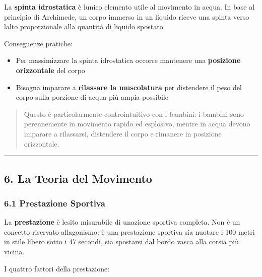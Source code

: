 \documentclass[a4paper,11pt]{article}
\providecommand{\tightlist}{%
  \setlength{\itemsep}{0pt}\setlength{\parskip}{0pt}}
\begin{document}
La \textbf{spinta idrostatica} è l\textquotesingle unico elemento utile
al movimento in acqua. In base al principio di Archimede, un corpo
immerso in un liquido riceve una spinta verso l\textquotesingle alto
proporzionale alla quantità di liquido spostato.

Conseguenze pratiche:

\begin{itemize}
      \tightlist
      \item
            Per massimizzare la spinta idrostatica occorre mantenere una
            \textbf{posizione orizzontale} del corpo
      \item
            Bisogna imparare a \textbf{rilassare la muscolatura} per distendere il
            peso del corpo sulla porzione di acqua più ampia possibile
\end{itemize}

\begin{quote}
      Questo è particolarmente controintuitivo con i bambini: i bambini sono
      perennemente in movimento rapido ed esplosivo, mentre in acqua devono
      imparare a rilassarsi, distendere il corpo e rimanere in posizione
      orizzontale.
\end{quote}

\begin{center}\rule{0.5\linewidth}{0.5pt}\end{center}

\subsection{6. La Teoria del Movimento}\label{la-teoria-del-movimento}

\subsubsection{6.1 Prestazione Sportiva}\label{prestazione-sportiva}

La \textbf{prestazione} è l\textquotesingle esito misurabile di
un\textquotesingle azione sportiva completa. Non è un concetto riservato
all\textquotesingle agonismo: è una prestazione sportiva sia nuotare i
100 metri in stile libero sotto i 47 secondi, sia spostarsi dal bordo
vasca alla corsia più vicina.

I quattro fattori della prestazione:
\end{document}
